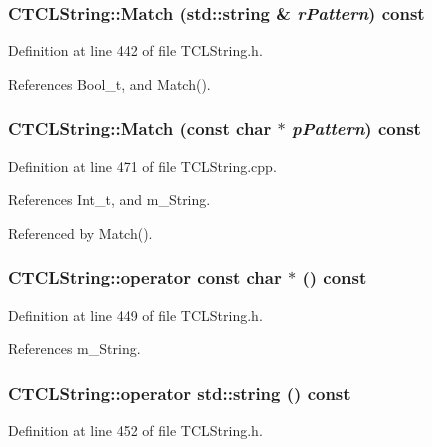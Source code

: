 \subsubsection{ CTCLString::Match (std::string \& {\em r\-Pattern}) const\hspace{0.3cm}{\tt  [inline]}}\label{classCTCLString_a29}




Definition at line 442 of file TCLString.h.

References Bool\_\-t, and Match().
\subsubsection{ CTCLString::Match (const char $\ast$ {\em p\-Pattern}) const}\label{classCTCLString_a28}




Definition at line 471 of file TCLString.cpp.

References Int\_\-t, and m\_\-String.

Referenced by Match().
\subsubsection{\setlength{\rightskip}{0pt plus 5cm}CTCLString::operator const char $\ast$ () const\hspace{0.3cm}{\tt  [inline]}}\label{classCTCLString_a31}




Definition at line 449 of file TCLString.h.

References m\_\-String.
\subsubsection{\setlength{\rightskip}{0pt plus 5cm}CTCLString::operator std::string () const\hspace{0.3cm}{\tt  [inline]}}\label{classCTCLString_a32}




Definition at line 452 of file TCLString.h.


